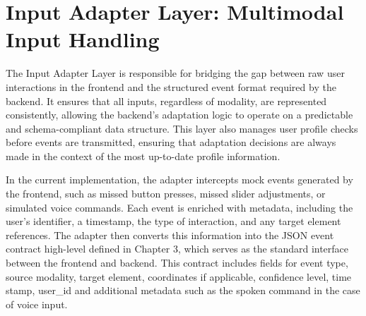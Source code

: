 \documentclass[openany]{book}
\begin{document}
\section{Input Adapter Layer: Multimodal Input Handling}
The Input Adapter Layer is responsible for bridging the gap between raw user interactions in the frontend and the structured event format required by the backend. It ensures that all inputs, regardless of modality, are represented consistently, allowing the backend’s adaptation logic to operate on a predictable and schema-compliant data structure. This layer also manages user profile checks before events are transmitted, ensuring that adaptation decisions are always made in the context of the most up-to-date profile information.

In the current implementation, the adapter intercepts mock events generated by the frontend, such as missed button presses, missed slider adjustments, or simulated voice commands. Each event is enriched with metadata, including the user’s identifier, a timestamp, the type of interaction, and any target element references. The adapter then converts this information into the JSON event contract high-level defined in Chapter 3, which serves as the standard interface between the frontend and backend. This contract includes fields for event type, source modality, target element, coordinates if applicable, confidence level, time stamp, user\_id and additional metadata such as the spoken command in the case of voice input.
\end{document}

